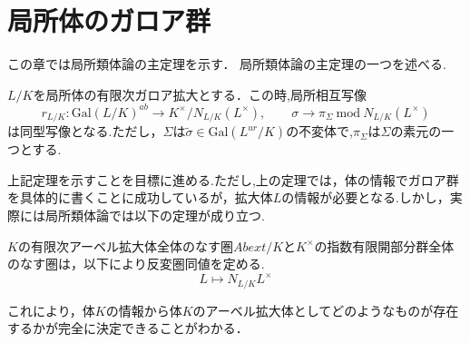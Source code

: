 \documentclass{ujarticle}
\begin{document}
\section{局所体のガロア群}
\label{sec:局所体のガロア群}
この章では局所類体論の主定理を示す．
局所類体論の主定理の一つを述べる.
\begin{thm}
$L/K$を局所体の有限次ガロア拡大とする．この時,局所相互写像
\begin{equation*}
  r_{L/K}:\mathrm{Gal}(L/K)^{ab} \to K^{\times}/N_{L/K}(L^{\times}), \qquad
  \sigma \to \pi_{\Sigma} \ \mathrm{mod}\  N_{L/K}(L^{\times})
\end{equation*}
は同型写像となる.ただし，$\Sigma$は$\tilde{\sigma} \in \mathrm{Gal}(L^{ur}/K)$の不変体で,$\pi_{\Sigma}$は$\Sigma$の素元の一つとする.
\end{thm}
上記定理を示すことを目標に進める.ただし,上の定理では，体の情報でガロア群を具体的に書くことに成功しているが，拡大体$L$の情報が必要となる.しかし，実際には局所類体論では以下の定理が成り立つ.
\begin{thm}
  $K$の有限次アーベル拡大体全体のなす圏$Abext/K$と$K^{\times}$の指数有限開部分群全体のなす圏は，以下により反変圏同値を定める.
  \begin{equation*}
    L \mapsto N_{L/K}L^{\times}
  \end{equation*}
\end{thm}
これにより，体$K$の情報から体$K$のアーベル拡大体としてどのようなものが存在するかが完全に決定できることがわかる．
\end{document}
